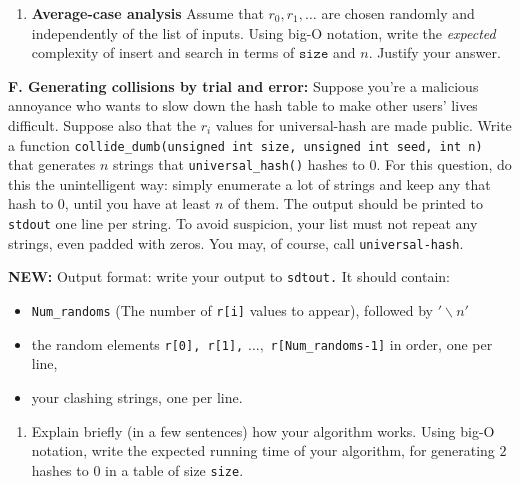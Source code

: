 \documentclass[11pt]{article}
\newcommand{\size}{{\texttt{size}}}
\begin{document}
\begin{enumerate}[resume]
    \item {\bf Average-case analysis}
        Assume that $r_0, r_1, \ldots$ are chosen randomly and independently of the list of inputs.
        Using big-O notation,
        write the \emph{expected} complexity of insert and search in terms of $\size$ and $n$.
        Justify your answer.
\end{enumerate}

\begin{description}
    \item{\bf F. Generating collisions by trial and error:}
        Suppose you're a malicious annoyance who wants to slow down the hash table to make other users' lives difficult.
        Suppose also that the $r_i$ values for universal-hash are made public.
        Write a function
        \texttt{collide\_dumb(unsigned int size, unsigned int seed, int n)}
        that generates $n$ strings that \texttt{universal\_hash()} hashes to 0.
        For this question, do this the unintelligent way:
        simply enumerate a lot of strings and keep any that hash to 0,
        until you have at least $n$ of them.
        The output should be printed to \texttt{stdout} one line per string.
        To avoid suspicion, your list must not repeat any strings, even padded with zeros.
        You may, of course, call \texttt{universal-hash}.

\end{description}

{\bf NEW\@: } Output format: write your output to \texttt{sdtout.}  It should contain:
\begin{itemize}
\item \texttt{Num\_randoms} (The number of \texttt{r[i]} values to appear), followed by $'\backslash n'$
\item the random elements \texttt{r[0], r[1],} $\ldots,$ \texttt{r[Num\_randoms-1]} in order, one per line,
\item your clashing strings, one per line.
\end{itemize}

\begin{enumerate}[resume]
\item Explain briefly (in a few sentences) how your algorithm works.  Using big-O notation,
    write the expected running time of your algorithm,
    for generating $2$ hashes to 0 in a table of size \texttt{size}.
\end{enumerate}
\end{document}
